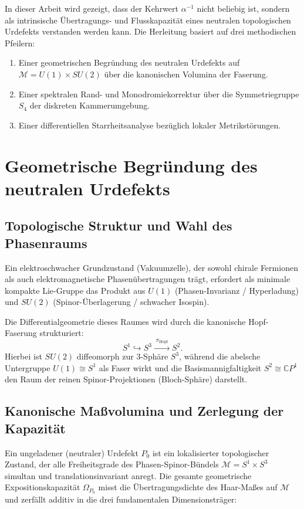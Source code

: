 \documentclass[11pt,a4paper]{article}
\begin{document}
In dieser Arbeit wird gezeigt, dass der Kehrwert $\alpha^{-1}$ nicht beliebig ist, sondern als intrinsische Übertragungs- und Flusskapazität eines neutralen topologischen Urdefekts verstanden werden kann. Die Herleitung basiert auf drei methodischen Pfeilern:
\begin{enumerate}\itemsep1pt \parskip0pt 
    \item Einer geometrischen Begründung des neutralen Urdefekts auf $\mathcal{M} = U(1) \times SU(2)$ über die kanonischen Volumina der Faserung.
    \item Einer spektralen Rand- und Monodromiekorrektur über die Symmetriegruppe $S_4$ der diskreten Kammerumgebung.
    \item Einer differentiellen Starrheitsanalyse bezüglich lokaler Metrikstörungen.
\end{enumerate}

\section{Geometrische Begründung des neutralen Urdefekts}\label{sec:urdefekt}

\subsection{Topologische Struktur und Wahl des Phasenraums}
Ein elektroschwacher Grundzustand (Vakuumzelle), der sowohl chirale Fermionen als auch elektromagnetische Phasenübertragungen trägt, erfordert als minimale kompakte Lie-Gruppe das Produkt aus $U(1)$ (Phasen-Invarianz / Hyperladung) und $SU(2)$ (Spinor-Überlagerung / schwacher Isospin). 

Die Differentialgeometrie dieses Raumes wird durch die kanonische Hopf-Faserung strukturiert:
\begin{equation}
S^1 \hookrightarrow S^3 \xrightarrow{\;\pi_{\text{Hopf}}\;} S^2.
\end{equation}
Hierbei ist $SU(2)$ diffeomorph zur 3-Sphäre $S^3$, während die abelsche Untergruppe $U(1) \cong S^1$ als Faser wirkt und die Basismannigfaltigkeit $S^2 \cong \mathbb{C}P^1$ den Raum der reinen Spinor-Projektionen (Bloch-Sphäre) darstellt.

\subsection{Kanonische Maßvolumina und Zerlegung der Kapazität}
Ein ungeladener (neutraler) Urdefekt $P_0$ ist ein lokalisierter topologischer Zustand, der alle Freiheitsgrade des Phasen-Spinor-Bündels $\mathcal{M} = S^1 \times S^3$ simultan und translationsinvariant anregt. Die gesamte geometrische Expositionskapazität $\Omega_{P_0}$ misst die Übertragungsdichte des Haar-Maßes auf $\mathcal{M}$ und zerfällt additiv in die drei fundamentalen Dimensionsträger:
\end{document}
